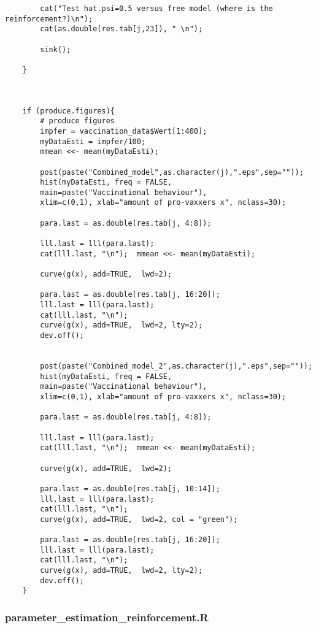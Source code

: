 \begin{lstlisting}
		cat("Test hat.psi=0.5 versus free model (where is the reinforcement?)\n");
		cat(as.double(res.tab[j,23]), " \n");
		
		sink();
	
	}
	
	
	
	if (produce.figures){
		# produce figures
		impfer = vaccination_data$Wert[1:400];
		myDataEsti = impfer/100;       
		mmean <<- mean(myDataEsti);
		
		post(paste("Combined_model",as.character(j),".eps",sep=""));
		hist(myDataEsti, freq = FALSE, 
		main=paste("Vaccinational behaviour"),
		xlim=c(0,1), xlab="amount of pro-vaxxers x", nclass=30);
		
		para.last = as.double(res.tab[j, 4:8]);
		
		lll.last = lll(para.last);
		cat(lll.last, "\n");  mmean <<- mean(myDataEsti);
		
		curve(g(x), add=TRUE,  lwd=2);
		
		para.last = as.double(res.tab[j, 16:20]);
		lll.last = lll(para.last);
		cat(lll.last, "\n");
		curve(g(x), add=TRUE,  lwd=2, lty=2);
		dev.off();
		
		
		post(paste("Combined_model_2",as.character(j),".eps",sep=""));
		hist(myDataEsti, freq = FALSE, 
		main=paste("Vaccinational behaviour"),
		xlim=c(0,1), xlab="amount of pro-vaxxers x", nclass=30);
		
		para.last = as.double(res.tab[j, 4:8]);
		
		lll.last = lll(para.last);
		cat(lll.last, "\n");  mmean <<- mean(myDataEsti);
		
		curve(g(x), add=TRUE,  lwd=2);
		
		para.last = as.double(res.tab[j, 10:14]);
		lll.last = lll(para.last);
		cat(lll.last, "\n");
		curve(g(x), add=TRUE,  lwd=2, col = "green");
		
		para.last = as.double(res.tab[j, 16:20]);
		lll.last = lll(para.last);
		cat(lll.last, "\n");
		curve(g(x), add=TRUE,  lwd=2, lty=2);
		dev.off();
	}
	\end{lstlisting}
	
	\subsubsection{parameter\_estimation\_reinforcement.R}
	

